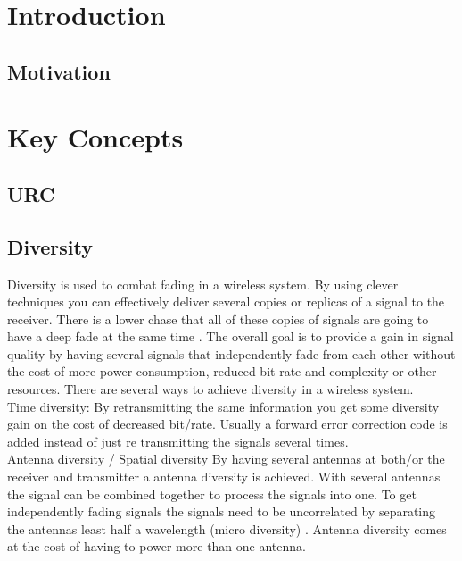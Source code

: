 \chapter{Introduction}
\section{Motivation}


\chapter{Key Concepts}
\section{URC}
\section{Diversity}
Diversity is used to combat fading in a wireless system. By using clever techniques you can effectively deliver several copies or replicas of a signal to the receiver. There is a lower chase that all of these copies of signals are going to have a deep fade at the same time \citep[p. 4-6]{diversityFuture}. The overall goal is to provide a gain in signal quality by having several signals that independently fade from each other without the cost of more power consumption, reduced bit rate and complexity or other resources. There are several ways to achieve diversity in a wireless system. \\
Time diversity: By retransmitting the same information you get some diversity gain on the cost of decreased bit/rate. Usually a forward error correction code is added instead of just re transmitting the signals several times. \\
Antenna diversity / Spatial diversity
By having several antennas at both/or the receiver and transmitter a antenna diversity is achieved. With several antennas the signal can be combined together to process the signals into one. To get independently fading signals the signals need to be uncorrelated by separating the antennas least half a wavelength (micro diversity) \citep{diversityAntenna}. Antenna diversity comes at the cost of having to power more than one antenna.


